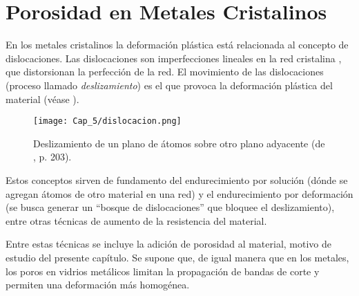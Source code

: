 
\section{Porosidad en Metales Cristalinos}
\label{S5_2}

En los metales cristalinos la deformación plástica está relacionada al concepto de dislocaciones. Las dislocaciones son imperfecciones lineales en
la red cristalina \citep{askeland98}, que distorsionan la perfección de la red. El movimiento de las dislocaciones (proceso llamado
\textit{deslizamiento}) es el que provoca la deformación plástica del material (véase ).

\begin{figure}[h!]
\centering
  \texttt{[image: Cap\_5/dislocacion.png]}
  \caption[Deslizamiento de un plano de átomos sobre otro plano adyacente]{Deslizamiento de un plano de átomos sobre otro plano adyacente
  (de \cite{shackelford04}, p. 203).}
  \label{C5:fg:dislocaciones}
\end{figure}



Estos conceptos sirven de fundamento del endurecimiento por solución (dónde se agregan átomos de otro material en una red) y el endurecimiento por deformación (se busca generar un ``bosque de dislocaciones'' que bloquee el deslizamiento), entre otras técnicas de aumento de la resistencia del material. 

Entre estas técnicas se incluye la adición de porosidad al material, motivo de estudio del presente capítulo. Se supone que, de igual manera que en los metales, los poros en vidrios metálicos limitan la propagación de bandas de corte y permiten una deformación más homogénea.

